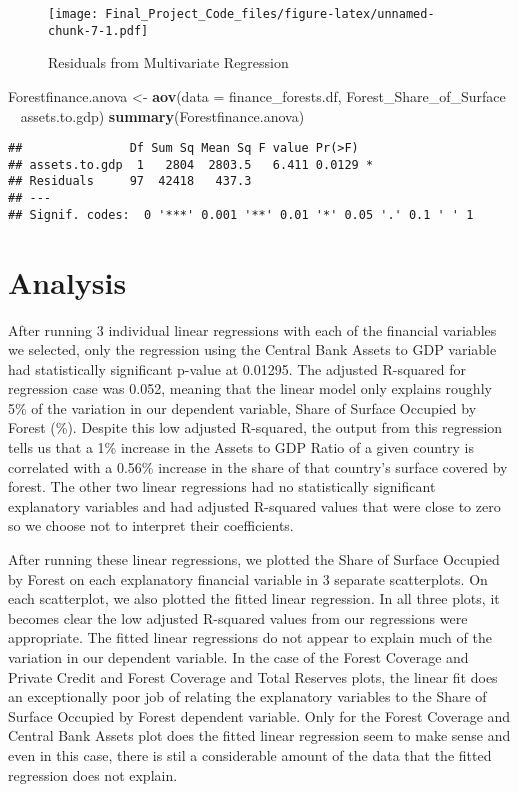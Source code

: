 \documentclass[
  12pt,
]{article}
\newenvironment{Shaded}{\begin{snugshade}}{\end{snugshade}}
\newcommand{\DataTypeTok}[1]{\textcolor[rgb]{0.13,0.29,0.53}{#1}}
\newcommand{\KeywordTok}[1]{\textcolor[rgb]{0.13,0.29,0.53}{\textbf{#1}}}
\newcommand{\NormalTok}[1]{#1}
\newcommand{\OperatorTok}[1]{\textcolor[rgb]{0.81,0.36,0.00}{\textbf{#1}}}
\newcommand{\StringTok}[1]{\textcolor[rgb]{0.31,0.60,0.02}{#1}}
\begin{document}
\begin{figure}
\centering
\texttt{[image: Final\_Project\_Code\_files/figure-latex/unnamed-chunk-7-1.pdf]}
\caption{Residuals from Multivariate Regression}
\end{figure}

\begin{Shaded}
\begin{Highlighting}[]
\NormalTok{Forestfinance.anova <-}\StringTok{ }\KeywordTok{aov}\NormalTok{(}\DataTypeTok{data =}\NormalTok{ finance_forests.df, Forest_Share_of_Surface }\OperatorTok{~}\StringTok{ }\NormalTok{assets.to.gdp)}
\KeywordTok{summary}\NormalTok{(Forestfinance.anova)}
\end{Highlighting}
\end{Shaded}

\begin{verbatim}
##               Df Sum Sq Mean Sq F value Pr(>F)  
## assets.to.gdp  1   2804  2803.5   6.411 0.0129 *
## Residuals     97  42418   437.3                 
## ---
## Signif. codes:  0 '***' 0.001 '**' 0.01 '*' 0.05 '.' 0.1 ' ' 1
\end{verbatim}

\newpage

\hypertarget{analysis}{%
\section{Analysis}\label{analysis}}

After running 3 individual linear regressions with each of the financial
variables we selected, only the regression using the Central Bank Assets
to GDP variable had statistically significant p-value at 0.01295. The
adjusted R-squared for regression case was 0.052, meaning that the
linear model only explains roughly 5\% of the variation in our dependent
variable, Share of Surface Occupied by Forest (\%). Despite this low
adjusted R-squared, the output from this regression tells us that a 1\%
increase in the Assets to GDP Ratio of a given country is correlated
with a 0.56\% increase in the share of that country's surface covered by
forest. The other two linear regressions had no statistically
significant explanatory variables and had adjusted R-squared values that
were close to zero so we choose not to interpret their coefficients.

After running these linear regressions, we plotted the Share of Surface
Occupied by Forest on each explanatory financial variable in 3 separate
scatterplots. On each scatterplot, we also plotted the fitted linear
regression. In all three plots, it becomes clear the low adjusted
R-squared values from our regressions were appropriate. The fitted
linear regressions do not appear to explain much of the variation in our
dependent variable. In the case of the Forest Coverage and Private
Credit and Forest Coverage and Total Reserves plots, the linear fit does
an exceptionally poor job of relating the explanatory variables to the
Share of Surface Occupied by Forest dependent variable. Only for the
Forest Coverage and Central Bank Assets plot does the fitted linear
regression seem to make sense and even in this case, there is stil a
considerable amount of the data that the fitted regression does not
explain.
\end{document}
